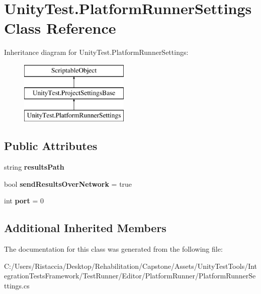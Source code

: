 \hypertarget{class_unity_test_1_1_platform_runner_settings}{}\section{Unity\+Test.\+Platform\+Runner\+Settings Class Reference}
\label{class_unity_test_1_1_platform_runner_settings}
Inheritance diagram for Unity\+Test.\+Platform\+Runner\+Settings\+:\begin{figure}[H]
\begin{center}
\leavevmode
\includegraphics[height=3.000000cm]{class_unity_test_1_1_platform_runner_settings}
\end{center}
\end{figure}
\subsection*{Public Attributes}
\begin{DoxyCompactItemize}
\item 
\mbox{\label{class_unity_test_1_1_platform_runner_settings_a34109a5b6654adf46c6da2fb2d787333}} 
string {\bfseries results\+Path}
\item 
\mbox{\label{class_unity_test_1_1_platform_runner_settings_a34600293ca598322f511c07b0e35dc56}} 
bool {\bfseries send\+Results\+Over\+Network} = true
\item 
\mbox{\label{class_unity_test_1_1_platform_runner_settings_a71de888775c5f003e2000e867b62e3f2}} 
int {\bfseries port} = 0
\end{DoxyCompactItemize}
\subsection*{Additional Inherited Members}


The documentation for this class was generated from the following file\+:\begin{DoxyCompactItemize}
\item 
C\+:/\+Users/\+Ristaccia/\+Desktop/\+Rehabilitation/\+Capstone/\+Assets/\+Unity\+Test\+Tools/\+Integration\+Tests\+Framework/\+Test\+Runner/\+Editor/\+Platform\+Runner/Platform\+Runner\+Settings.\+cs\end{DoxyCompactItemize}
